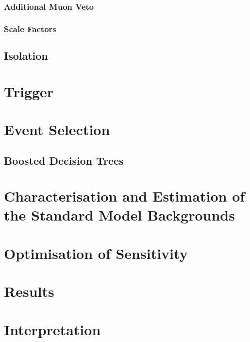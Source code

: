 \subsubsection{Additional Muon Veto}
\subsubsection{Scale Factors}
\subsection{Isolation}


\section{Trigger}

\section{Event Selection}
\subsection{Boosted Decision Trees}

\section{Characterisation and Estimation of the Standard Model Backgrounds}

\section{Optimisation of Sensitivity}

\section{Results}

\section{Interpretation}
